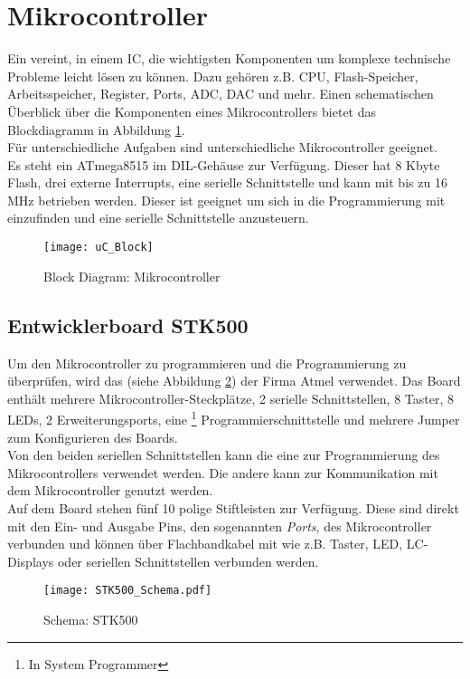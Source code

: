 \section{Mikrocontroller}
\label{sec:Mikrocontroller}
Ein  vereint, in einem IC, die wichtigsten Komponenten um komplexe technische Probleme leicht lösen zu können. Dazu gehören z.B. CPU, Flash-Speicher, Arbeitsspeicher, Register, Ports, ADC, DAC und mehr. Einen schematischen Überblick über die Komponenten eines Mikrocontrollers bietet das Blockdiagramm in Abbildung \ref{fig:uC_Blockdiagramm}. \\
Für unterschiedliche Aufgaben sind unterschiedliche Mikrocontroller geeignet.\\
Es steht ein ATmega8515 \cite{atmel:8515} im DIL-Gehäuse zur Verfügung. Dieser hat 8 Kbyte Flash, drei externe Interrupts, eine serielle Schnittstelle und kann mit bis zu 16 MHz betrieben werden. 
Dieser ist geeignet um sich in die Programmierung mit  einzufinden und eine serielle Schnittstelle anzusteuern. \\
\begin{figure}[htb]
\centering
\texttt{[image: uC\_Block]}
\caption{Block Diagram: Mikrocontroller}
\label{fig:uC_Blockdiagramm}
\citep{atmel:ug_324A}
\end{figure}

\subsection{Entwicklerboard STK500}
\label{sec:STK500}
Um den Mikrocontroller zu programmieren und die Programmierung zu überprüfen, wird das (siehe Abbildung \ref{fig:STK500}) der Firma Atmel verwendet. Das Board enthält mehrere Mikrocontroller-Steckplätze, 2 serielle Schnittstellen, 8 Taster, 8 LEDs, 2 Erweiterungsports, eine \footnote{In System Programmer} Programmierschnittstelle und mehrere Jumper zum Konfigurieren des Boards.\\
Von den beiden seriellen Schnittstellen kann die eine zur Programmierung des Mikrocontrollers verwendet werden. Die andere kann zur Kommunikation mit dem Mikrocontroller genutzt werden.\\
Auf dem Board stehen fünf 10 polige Stiftleisten 
zur Verfügung. Diese sind direkt mit den Ein- und Ausgabe Pins, den sogenannten \emph{Ports}, des Mikrocontroller verbunden und können über Flachbandkabel mit  wie z.B. Taster, LED, LC-Displays oder seriellen Schnittstellen verbunden werden.
\begin{figure}[htb]
\centering
\texttt{[image: STK500\_Schema.pdf]}
\caption{Schema: STK500}
\label{fig:STK500}
\citep{atmel:ug_STK500}
\end{figure}

